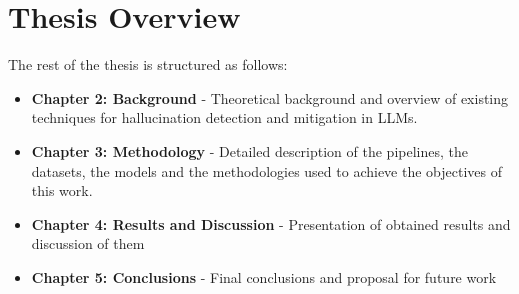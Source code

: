 \section{Thesis Overview}

The rest of the thesis is structured as follows:
\begin{itemize}
    \item \textbf{Chapter 2: Background} - Theoretical background and overview of existing techniques for hallucination detection and mitigation in LLMs. 
    \item \textbf{Chapter 3: Methodology} - Detailed description of the pipelines, the datasets, the models and the methodologies used to achieve the objectives of this work.
    \item \textbf{Chapter 4: Results and Discussion} - Presentation of obtained results and discussion of them
    \item \textbf{Chapter 5: Conclusions} - Final conclusions and proposal for future work
\end{itemize}